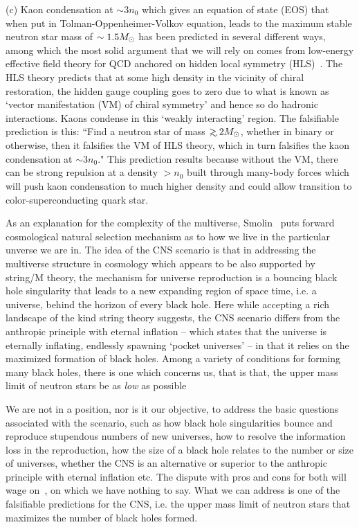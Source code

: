 \documentclass[aps,twocolumn,preprintnumbers,%
superscriptaddress,floatfix]{revtex4}
\begin{document}
(c) Kaon condensation at $\sim 3n_0$ which gives an equation of state (EOS) that when put in Tolman-Oppenheimer-Volkov equation, leads to the maximum stable neutron star mass of $\sim 1.5\mbox{$M_\odot$}$ has been predicted in several different ways, among which the most solid argument that we will rely on comes from low-energy effective field theory for QCD anchored on hidden local symmetry (HLS)~\cite{HY:PR}. The HLS theory predicts that at some high density in the vicinity of chiral restoration,  the hidden gauge coupling goes to zero due to what is known as `vector manifestation (VM) of chiral symmetry' and hence so do hadronic interactions. Kaons condense in this `weakly interacting' region. The falsifiable prediction is this: ``Find a neutron star of mass $\gsim 2 \msun$, whether in binary or otherwise, then it falsifies the VM of HLS theory, which in turn falsifies the kaon condensation at $\sim 3n_0$." This prediction results because without the VM, there can be strong repulsion at a density $> n_0$ built through many-body forces which will push kaon condensation to much higher density and could allow transition to color-superconducting  quark star.

As an explanation for the complexity of the multiverse, Smolin~\cite{Smo97} puts forward cosmological natural selection mechanism as to how we live in the particular unverse we are in.
The idea of the CNS scenario is that in addressing the multiverse structure in cosmology which appears to be also supported by string/M theory, the mechanism for universe reproduction  is a bouncing black hole singularity that leads to a new expanding region of space time, i.e. a universe, behind the horizon of every black hole. Here while accepting a rich landscape of the kind string theory suggests, the CNS scenario differs from  the anthropic principle with eternal inflation -- which states that the universe is eternally inflating, endlessly spawning `pocket universes' -- in that it relies on  the maximized formation of black holes. Among a variety of conditions for forming many black holes, there is one which concerns us, that is that, the upper mass limit of neutron stars be as {\em low} as possible~\cite{Smo04}

We are not in a position, nor is it our objective, to address the basic questions associated with the scenario, such as how black hole singularities bounce and reproduce stupendous numbers of new universes, how to resolve the information loss in the reproduction, how the size of a black hole relates to the number or size of universes, whether the CNS is an alternative or superior to the anthropic principle with eternal inflation etc. The dispute with pros and cons for both will wage on~\cite{debate}, on which we have nothing to say. What we can address is one of the falsifiable predictions for the CNS, i.e. the upper mass limit of neutron stars that maximizes the number of black holes formed.
\end{document}
